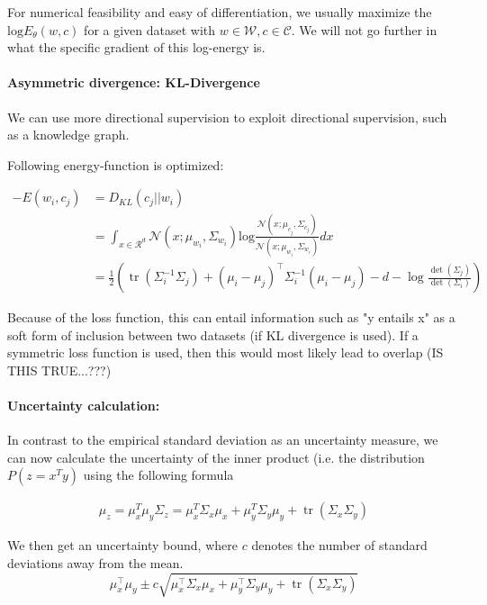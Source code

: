 \documentclass[a4paper,12pt,twoside,openright]{report}
\begin{document}
For numerical feasibility and easy of differentiation, we usually maximize the $\text{log} E_\theta(w, c)$ for a given dataset with $w \in \mathcal{W}, c \in \mathcal{C}$.
We will not go further in what the specific gradient of this log-energy is.

\paragraph{Asymmetric divergence: KL-Divergence}

We can use more directional supervision to exploit directional supervision, such as a knowledge graph.

Following energy-function is optimized:

\begin{align}
-E(w_i, c_j) & = D_{KL}(c_j || w_i) \\
&= \int_{x \in \mathcal{R}^d} \mathcal{N}(x; \mu_{w_i}, \Sigma_{w_i}) \text{log} \frac{\mathcal{N}(x; \mu_{c_j}, \Sigma_{c_j})}{\mathcal{N}(x; \mu_{w_i}, \Sigma_{w_i})} dx \\
&= \frac{1}{2}\left(\operatorname{tr}\left(\Sigma_{i}^{-1} \Sigma_{j}\right)+\left(\mu_{i}-\mu_{j}\right)^{\top} \Sigma_{i}^{-1}\left(\mu_{i}-\mu_{j}\right)-d-\log \frac{\operatorname{det}\left(\Sigma_{j}\right)}{\operatorname{det}\left(\Sigma_{i}\right)}\right)
\end{align}

Because of the loss function, this can entail information such as "y entails x" as a soft form of inclusion between two datasets (if KL divergence is used).
If a symmetric loss function is used, then this would most likely lead to overlap (IS THIS TRUE...???)

\paragraph{Uncertainty calculation:} In contrast to the empirical standard deviation as an uncertainty measure, we can now calculate the uncertainty of the inner product (i.e. the distribution $P(z=x^T y)$ using the following formula

\begin{align}
\mu_z = \mu_x^T \mu_y
\Sigma_z = \mu_{x}^T \Sigma_{x} \mu_{x}+\mu_{y}^T \Sigma_{y} \mu_{y}+\operatorname{tr}\left(\Sigma_{x} \Sigma_{y}\right)
\end{align}

We then get an uncertainty bound, where $c$ denotes the number of standard deviations away from the mean.
\begin{equation}
\mu_{x}^{\top} \mu_{y} \pm c \sqrt{\mu_{x}^{\top} \Sigma_{x} \mu_{x}+\mu_{y}^{\top} \Sigma_{y} \mu_{y}+\operatorname{tr}\left(\Sigma_{x} \Sigma_{y}\right)}
\end{equation}
\end{document}
